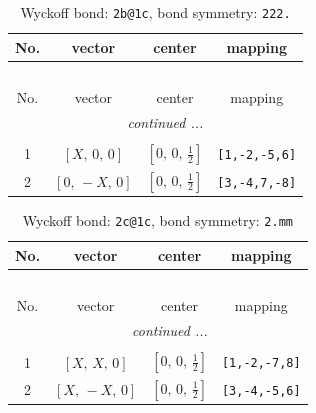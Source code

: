 \documentclass[fleqn,8pt]{jsarticle}
\begin{document}
\renewcommand{\arraystretch}{1.2}
\begin{longtable}{cccc}
\caption{Wyckoff bond: {\tt 2b@1c}, bond symmetry: {\tt 222.}}
 \\
 \hline \hline
No. & vector & center & mapping \\ \hline \endfirsthead

\multicolumn{3}{l}{\tablename\ \thetable{}} \\
 \hline \hline
No. & vector & center & mapping \\ \hline \endhead

 \hline \hline
\multicolumn{3}{r}{\footnotesize\it continued ...} \\ \endfoot

 \hline \hline
\multicolumn{3}{r}{} \\ \endlastfoot

1 & $\left[ X,\, 0,\, 0 \right]$ & $\left[ 0,\, 0,\, \frac{1}{2} \right]$ & {\tt [1,-2,-5,6]} \\ \hline
2 & $\left[ 0,\, - X,\, 0 \right]$ & $\left[ 0,\, 0,\, \frac{1}{2} \right]$ & {\tt [3,-4,7,-8]} \\
\end{longtable}
\renewcommand{\arraystretch}{1.2}
\begin{longtable}{cccc}
\caption{Wyckoff bond: {\tt 2c@1c}, bond symmetry: {\tt 2.mm}}
 \\
 \hline \hline
No. & vector & center & mapping \\ \hline \endfirsthead

\multicolumn{3}{l}{\tablename\ \thetable{}} \\
 \hline \hline
No. & vector & center & mapping \\ \hline \endhead

 \hline \hline
\multicolumn{3}{r}{\footnotesize\it continued ...} \\ \endfoot

 \hline \hline
\multicolumn{3}{r}{} \\ \endlastfoot

1 & $\left[ X,\, X,\, 0 \right]$ & $\left[ 0,\, 0,\, \frac{1}{2} \right]$ & {\tt [1,-2,-7,8]} \\ \hline
2 & $\left[ X,\, - X,\, 0 \right]$ & $\left[ 0,\, 0,\, \frac{1}{2} \right]$ & {\tt [3,-4,-5,6]} \\
\end{longtable}
\renewcommand{\arraystretch}{1.2}
\end{document}
